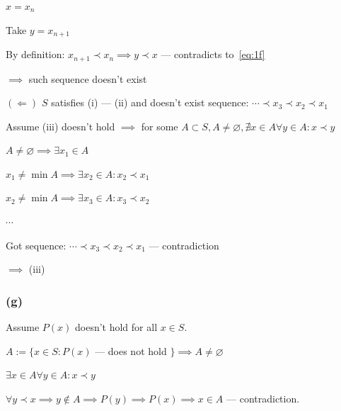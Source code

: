 \documentclass{article}
\begin{document}
\( x = x_{n} \)

Take \( y = x_{n+1} \)

By definition: \( x_{n+1} \prec x_{n} \implies y \prec x \) --- contradicts to~\eqref{eq:1f}

\( \implies \) such sequence doesn't exist

\( (\Longleftarrow) \) \( S \) satisfies (i) --- (ii) and doesn't exist sequence: \( \cdots \prec x_{3} \prec x_{2} \prec x_{1} \)

Assume (iii) doesn't hold \( \implies \) for some \( A \subset S, A \neq \varnothing, \nexists x \in A \forall y \in A: x \prec y \)

\( A \neq \varnothing \implies \exists x_{1} \in A \)

\( x_{1} \neq \min A \implies \exists x_{2} \in A: x_{2} \prec x_{1} \)

\( x_{2} \neq \min A \implies \exists x_{3} \in A: x_{3} \prec x_{2} \)

\( \cdots \)

Got sequence: \( \cdots \prec x_{3} \prec x_{2} \prec x_{1} \) --- contradiction

\( \implies \) (iii)

\subsubsection*{(g)}

Assume \( P(x) \) doesn't hold for all \( x \in S \).

\( A := \{ x \in S: P(x) \) --- does not hold \( \} \implies A \neq \varnothing \)

\( \exists x \in A \forall y \in A: x \prec y \)

\( \forall y \prec x \implies y \notin A \implies P(y) \implies P(x) \implies x \in A \) --- contradiction.
\end{document}
